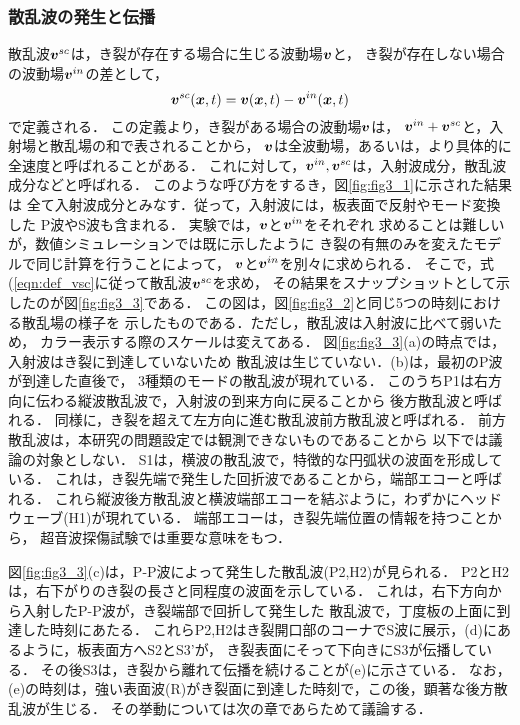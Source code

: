 \subsubsection{散乱波の発生と伝播}
散乱波$\mbox{\boldmath $v$}^{sc}$は，き裂が存在する場合に生じる波動場$\mbox{\boldmath $v$}$と，
き裂が存在しない場合の波動場$\mbox{\boldmath $v$}^{in}$の差として，
\begin{equation}
	\fat{v}^{sc}(\fat{x},t)=\fat{v}(\fat{x},t)-\fat{v}^{in}(\fat{x},t)
	\label{eqn:def_vsc}
\end{equation}
で定義される．
この定義より，き裂がある場合の波動場$\mbox{\boldmath $v$}$は，
$\mbox{\boldmath $v$}^{in}+\mbox{\boldmath $v$}^{sc}$と，入射場と散乱場の和で表されることから，
$\mbox{\boldmath $v$}$は全波動場，あるいは，より具体的に全速度と呼ばれることがある．
これに対して，$\mbox{\boldmath $v$}^{in},\mbox{\boldmath $v$}^{sc}$は，入射波成分，散乱波成分などと呼ばれる．
このような呼び方をするき，図\ref{fig:fig3_1}に示された結果は
全て入射波成分とみなす．従って，入射波には，板表面で反射やモード変換した
P波やS波も含まれる．
実験では，$\mbox{\boldmath $v$}$と$\mbox{\boldmath $v$}^{in}$をそれぞれ
求めることは難しいが，数値シミュレーションでは既に示したように
き裂の有無のみを変えたモデルで同じ計算を行うことによって，
$\mbox{\boldmath $v$}$と$\mbox{\boldmath $v$}^{in}$を別々に求められる．
そこで，式(\ref{eqn:def_vsc}に従って散乱波$\mbox{\boldmath $v$}^{sc}$を求め，
その結果をスナップショットとして示したのが図\ref{fig:fig3_3}である．
この図は，図\ref{fig:fig3_2}と同じ5つの時刻における散乱場の様子を
示したものである．ただし，散乱波は入射波に比べて弱いため，
カラー表示する際のスケールは変えてある．
図\ref{fig:fig3_3}(a)の時点では，入射波はき裂に到達していないため
散乱波は生じていない．(b)は，最初のP波が到達した直後で，
3種類のモードの散乱波が現れている．
このうちP1は右方向に伝わる縦波散乱波で，入射波の到来方向に戻ることから
後方散乱波と呼ばれる．
同様に，き裂を超えて左方向に進む散乱波前方散乱波と呼ばれる．
前方散乱波は，本研究の問題設定では観測できないものであることから
以下では議論の対象としない．
S1は，横波の散乱波で，特徴的な円弧状の波面を形成している．
これは，き裂先端で発生した回折波であることから，端部エコーと呼ばれる．
これら縦波後方散乱波と横波端部エコーを結ぶように，わずかにヘッドウェーブ(H1)が現れている．
端部エコーは，き裂先端位置の情報を持つことから，
超音波探傷試験では重要な意味をもつ．

図\ref{fig:fig3_3}(c)は，P-P波によって発生した散乱波(P2,H2)が見られる．
P2とH2は，右下がりのき裂の長さと同程度の波面を示している．
これは，右下方向から入射したP-P波が，き裂端部で回折して発生した
散乱波で，丁度板の上面に到達した時刻にあたる．
これらP2,H2はき裂開口部のコーナでS波に展示，(d)にあるように，板表面方へS2とS3'が，
き裂表面にそって下向きにS3が伝播している．
その後S3は，き裂から離れて伝播を続けることが(e)に示さている．
なお，(e)の時刻は，強い表面波(R)がき裂面に到達した時刻で，この後，顕著な後方散乱波が生じる．
その挙動については次の章であらためて議論する．
%
